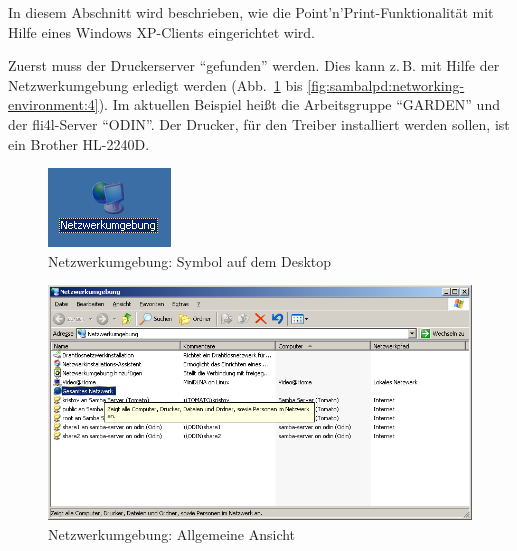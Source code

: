 

In diesem Abschnitt wird beschrieben, wie die Point'n'Print-Funktionalität mit
Hilfe eines Windows XP-Clients eingerichtet wird.

Zuerst muss der Druckerserver ``gefunden'' werden. Dies kann z.\,B. mit Hilfe
der Netzwerkumgebung erledigt werden
(Abb.~\ref{fig:sambalpd:icon-networking-environment} bis
\ref{fig:sambalpd:networking-environment:4}). Im aktuellen Beispiel heißt die
Arbeitsgruppe ``GARDEN'' und der fli4l-Server ``ODIN''. Der Drucker, für den
Treiber installiert werden sollen, ist ein Brother HL-2240D.

\begin{figure}[hbt!]
\centering
\includegraphics[]{image001}
\caption{Netzwerkumgebung: Symbol auf dem Desktop}
\label{fig:sambalpd:icon-networking-environment}
\end{figure}

\begin{figure}[hbt!]
\centering
\includegraphics[width=\columnwidth]{image002}
\caption{Netzwerkumgebung: Allgemeine Ansicht}
\label{fig:sambalpd:networking-environment:1}
\end{figure}

